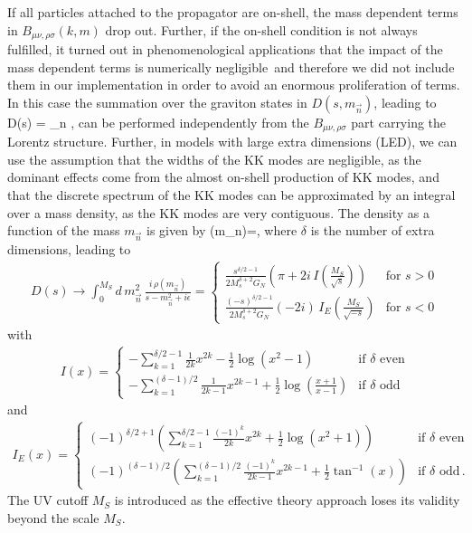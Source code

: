 If all particles attached to the propagator are on-shell, 
the mass dependent terms in $B_{\mu\nu,\rho\sigma}(k,m)$ drop out.
Further, if the on-shell condition is not always fulfilled, 
it turned out in phenomenological applications that the impact of the mass dependent terms is numerically 
negligible\,\cite{Gleisberg:2003ue,Greiner:2013gca}
and therefore we did not include them in our implementation
in order to avoid an enormous proliferation of terms.
In this case the summation over the graviton states  in $D(s,m_{\vec n})$, leading to
\be
D(s) = \sum_{\vec n} \;,
\ee
can be performed independently from the  $B_{\mu\nu,\rho\sigma}$ part carrying the Lorentz structure.
Further, in  models with large extra dimensions (LED),
 we can use the assumption that the widths of the KK modes are negligible, 
as the dominant effects come from the almost on-shell production of KK modes, 
and that the discrete spectrum of the KK  modes can be approximated by an
integral over a mass density, as the  KK modes are very contiguous.
The density as a function of the mass $m_{\vec n}$ is given by
\be
\rho(m_{\vec n})=\;,
\ee
where $\delta$ is the number of extra dimensions, leading to \,\cite{Han:1998sg}
\begin{align}
	D(s) \to  \int_0^{M_S} d\,m_{\vec n}^2\,
	\frac{i\,\rho(m_{\vec n})}{s-m_{\vec n}^2+ i \epsilon}
	= \begin{cases} \frac{ s^{\delta/2-1}}{2M_{s}^{\delta + 2} G_N } \left( \pi + 2 i \, I(\frac{M_S}{\sqrt{s}}) \right) & \text{for\ } s>0 \\
		\frac{ (-s)^{\delta/2-1}}{2M_{s}^{\delta + 2} G_N} (-2i)\, I_E(\frac{M_S}{\sqrt{-s}}) & \text{for\ } s<0 
	\end{cases}
	\label{eq:propagator}
\end{align}
with 
\begin{align}
	I(x) = \begin{cases} - \sum_{k=1}^{\delta/2-1} \frac1{2k} x^{2k} - \frac12 \log(x^2-1)& \text{if\ } \delta \text{ even} \\
		- \sum_{k=1}^{(\delta-1)/2 } \frac{1}{2k-1} x^{2k-1} + \frac12 \log\left( \frac{x+1}{x-1} \right) & \text{if\ } \delta \text{ odd}
	\end{cases}
\end{align}
and
\begin{align}
	I_E(x) = \begin{cases} (-1)^{\delta/2 + 1} \left( \sum_{k=1}^{\delta/2-1} \frac{(-1)^k}{2k} x^{2k} + \frac12 \log(x^2+1)  \right) 
		& \text{if } \delta \text{ even} \\
		(-1)^{(\delta-1)/2} \left(   \sum_{k=1}^{(\delta-1)/2 } \frac{(-1)^k}{2k-1} x^{2k-1} + \frac12 \tan^{-1}(x) \right)   & \text{if } \delta \text{ odd} \,.
	\end{cases}
\end{align}
The UV cutoff $M_S$ is introduced as the effective theory approach loses its validity beyond the scale $M_S$.


